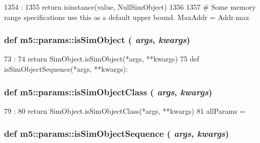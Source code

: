 \begin{DoxyCode}
1354                         :
1355     return isinstance(value, NullSimObject)
1356 
1357 # Some memory range specifications use this as a default upper bound.
MaxAddr = Addr.max
\end{DoxyCode}
\hypertarget{namespacem5_1_1params_a3b124725e754deabb6f2a6bbe1940c9c}{
\subsubsection[{isSimObject}]{\setlength{\rightskip}{0pt plus 5cm}def m5::params::isSimObject ( {\em args}, \/   {\em kwargs})}}
\label{namespacem5_1_1params_a3b124725e754deabb6f2a6bbe1940c9c}



\begin{DoxyCode}
73                                 :
74     return SimObject.isSimObject(*args, **kwargs)
75 
def isSimObjectSequence(*args, **kwargs):
\end{DoxyCode}
\hypertarget{namespacem5_1_1params_ac12f441c590f82fbf6dad498232b5508}{
\subsubsection[{isSimObjectClass}]{\setlength{\rightskip}{0pt plus 5cm}def m5::params::isSimObjectClass ( {\em args}, \/   {\em kwargs})}}
\label{namespacem5_1_1params_ac12f441c590f82fbf6dad498232b5508}



\begin{DoxyCode}
79                                      :
80     return SimObject.isSimObjectClass(*args, **kwargs)
81 
allParams = {}
\end{DoxyCode}
\hypertarget{namespacem5_1_1params_a0f12664353778764c21b1828af5ccdf2}{
\subsubsection[{isSimObjectSequence}]{\setlength{\rightskip}{0pt plus 5cm}def m5::params::isSimObjectSequence ( {\em args}, \/   {\em kwargs})}}
\label{namespacem5_1_1params_a0f12664353778764c21b1828af5ccdf2}



